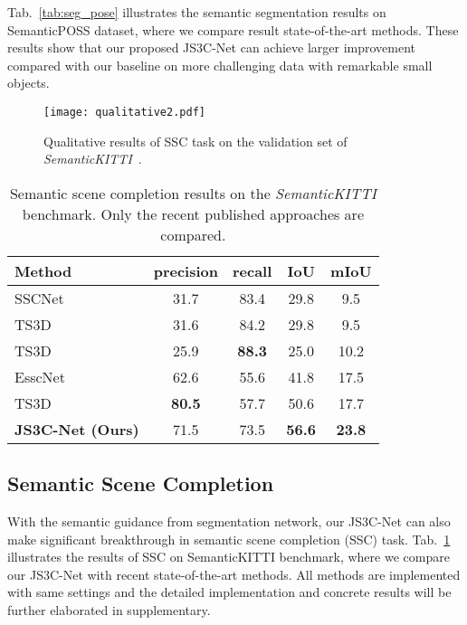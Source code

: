 \documentclass[letterpaper]{article} \usepackage{aaai21}  \usepackage{times}  \usepackage{helvet} \usepackage{courier}  \usepackage[hyphens]{url}  \usepackage{graphicx} \urlstyle{rm} \def\UrlFont{\rm}  \usepackage{natbib}  \usepackage{booktabs}
\begin{document}
	Tab.~\ref{tab:seg_pose} illustrates the semantic segmentation results on SemanticPOSS dataset, where we compare result state-of-the-art methods.
These  results show that our proposed JS3C-Net can achieve larger improvement compared with our baseline on more challenging data with remarkable small objects.
	
	\begin{figure*}[t]
		\noindent\texttt{[image: qualitative2.pdf]}
		
		\caption{Qualitative results of SSC task on the validation set of \textit{SemanticKITTI}~\cite{behley2019semantickitti}.}
		\label{fig:fig5}
		
	\end{figure*}
	
	\begin{table}
	\small
		\caption{Semantic scene completion results on the \textit{SemanticKITTI} benchmark. Only the recent published approaches are compared.
		}
		\begin{center}
		\begin{tabular}{lccc|c}
    		\hline
    		Method
    		&{precision}&
    		{recall}&
    		{IoU}&	
    		{mIoU} \\
    		\hline
    		\hline
    		
        	SSCNet &31.7 &83.4 &29.8  &9.5\\
    		TS3D &31.6 &84.2 &29.8 &9.5\\
    		TS3D &25.9 &\bf{88.3} &25.0 &10.2\\
    		EsscNet &62.6 &55.6 &41.8 &17.5\\
    		TS3D &\bf{80.5} &57.7 &50.6 &17.7\\
    		\hline
    		\textbf{JS3C-Net (Ours)} & 71.5 &73.5& \bf{56.6} &\bf{23.8}\\
    		\hline
	    \end{tabular}
		\end{center}
		
		\label{tab:complt}
\end{table}
	
	\subsection{Semantic Scene Completion} 
	
	With the semantic guidance from segmentation network, our JS3C-Net can also make significant breakthrough in semantic scene completion (SSC) task. 
Tab.~\ref{tab:complt} illustrates the results of SSC on SemanticKITTI benchmark, where we compare our JS3C-Net with recent state-of-the-art methods. All methods are implemented with same settings and the detailed implementation and concrete results will be further elaborated in supplementary.
	
\end{document}
